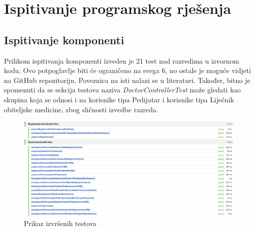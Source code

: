 	
		\section{Ispitivanje programskog rješenja}
			\subsection{Ispitivanje komponenti}
			\text Prilikom ispitivanja komponenti izveden je 21 test nad razredima u izvornom kodu. Ovo potpoglavlje biti će ograničeno na svega 6, no ostale je moguće vidjeti na GitHub repozitoriju. Poveznica na isti nalazi se u literaturi. Također, bitno je spomenuti da se sekcija testova naziva \textit{DoctorControllerTest} može gledati kao skupina koja se odnosi i na korisnike tipa Pedijatar i korisnike tipa Liječnik obiteljske medicine, zbog sličnosti izvedbe razreda.
			
			\begin{figure}[H]
				\includegraphics[scale=0.3]{slike/testoviRazreda.PNG} %
				\centering
				\caption{Prikaz izvršenih testova}
				\label{fig:slikatestova}
			\end{figure}
			
